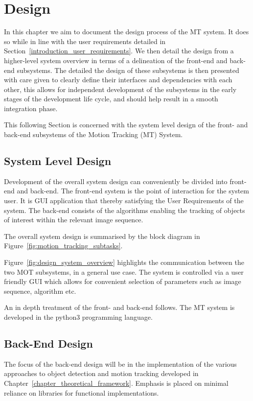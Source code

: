 \chapter{Design}\label{chapter_design}
In this chapter we aim to document the design process of the MT system. It does so
while in line with the user requirements detailed in 
Section~\ref{introduction_user_requirements}. 
We then detail the design from a higher-level system overview in terms of a
delineation of the front-end and back-end subsystems. The detailed the design of
these subsystems is then presented with care given to clearly define their
interfaces and dependencies with each other, this allows for independent
development of the subsystems in the early stages of the development life cycle,
and should help result in a smooth integration phase.

This following Section is concerned with the system level design of the
front- and back-end subsystems of the Motion Tracking (MT) System.

\section{System Level Design}
Development of the overall system design can conveniently be divided into
front-end and back-end. The front-end system is the point of interaction for the
system user. It is GUI application that thereby satisfying the User Requirements
of the system. The back-end consists of the algorithms enabling the tracking of
objects of interest within the relevant image sequence.

The overall system design is summarised by the block diagram in
Figure~\ref{fig:motion_tracking_subtasks}.  


Figure~\ref{fig:design_system_overview} highlights the communication between the two MOT
subsystems, in a general use case. The system is controlled via a user
friendly GUI which allows for convenient selection of parameters such as
image sequence, algorithm etc.

An in depth treatment of the front- and back-end follows. The MT system is
developed in the python3 programming language. 

\section{Back-End Design}\label{design_back_end}
The focus of the back-end design will be in the implementation of the various
approaches to object detection and motion tracking developed in
Chapter~\ref{chapter_theoretical_framework}.
Emphasis is placed on minimal reliance on libraries for functional
implementations.

